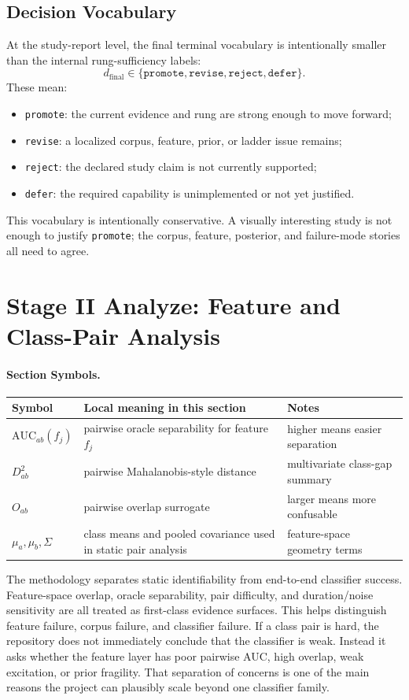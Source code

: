 \documentclass[11pt]{article}
\newcommand{\sectionsymbol}[3]{#1 & #2 & #3 \\}
\newcommand{\sectionsymbols}[1]{%
\begin{center}
\small
\setlength{\tabcolsep}{4pt}
\begin{tabularx}{0.95\textwidth}{>{\raggedright\arraybackslash}p{0.16\textwidth}X>{\raggedright\arraybackslash}p{0.18\textwidth}}
\toprule
Symbol & Local meaning in this section & Notes \\
\midrule
#1
\bottomrule
\end{tabularx}
\end{center}
}
\begin{document}
\subsection{Decision Vocabulary}
At the study-report level, the final terminal vocabulary is intentionally
smaller than the internal rung-sufficiency labels:
\begin{equation}
d_{\text{final}} \in \{\texttt{promote}, \texttt{revise}, \texttt{reject}, \texttt{defer}\}.
\end{equation}
These mean:
\begin{itemize}[leftmargin=1.5em]
  \item \texttt{promote}: the current evidence and rung are strong enough to move forward;
  \item \texttt{revise}: a localized corpus, feature, prior, or ladder issue remains;
  \item \texttt{reject}: the declared study claim is not currently supported;
  \item \texttt{defer}: the required capability is unimplemented or not yet justified.
\end{itemize}
This vocabulary is intentionally conservative. A visually interesting study is
not enough to justify \texttt{promote}; the corpus, feature, posterior, and
failure-mode stories all need to agree.

\section{Stage II Analyze: Feature and Class-Pair Analysis}
\paragraph{Section Symbols.}
\sectionsymbols{
\sectionsymbol{\(\mathrm{AUC}_{ab}(f_j)\)}{pairwise oracle separability for feature \(f_j\)}{higher means easier separation}
\sectionsymbol{\(D^2_{ab}\)}{pairwise Mahalanobis-style distance}{multivariate class-gap summary}
\sectionsymbol{\(O_{ab}\)}{pairwise overlap surrogate}{larger means more confusable}
\sectionsymbol{\(\mu_a, \mu_b, \Sigma\)}{class means and pooled covariance used in static pair analysis}{feature-space geometry terms}
}

\noindent
The methodology separates static identifiability from end-to-end classifier success. Feature-space overlap, oracle separability, pair difficulty, and duration/noise sensitivity are all treated as first-class evidence surfaces. This helps distinguish feature failure, corpus failure, and classifier failure.
If a class pair is hard, the repository does not immediately conclude that the classifier is weak. Instead it asks whether the feature layer has poor pairwise AUC, high overlap, weak excitation, or prior fragility. That separation of concerns is one of the main reasons the project can plausibly scale beyond one classifier family.
\end{document}

